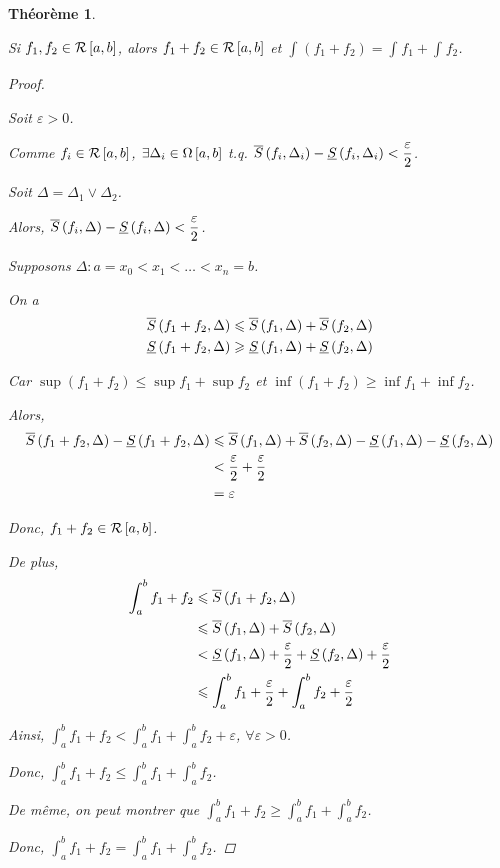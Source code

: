 \documentclass{report}
\newcommand*{\dint}[3]{\displaystyle\int_{#1}^{#2}#3}
\newcommand*{\raffinement}[2]{#1 \vee #2}
\newcommand*{\eps}{\varepsilon}
\newcommand*{\lte}{\leqslant}
\newcommand*{\gte}{\geqslant}
\newtheorem*{thm}{Th\'eor\`eme}
\theoremstyle{definition}
\theoremstyle{remark}
\begin{document}
	\begin{thm}
		~

		Si $f_1,f_2 \in \riemann$, alors $f_1+f_2 \in \riemann$ et $\dint{}{}{\left( f_1+f_2 \right)} =\dint{}{}{f_1} + \dint{}{}{f_2}$.
		\begin{proof}~

			Soit $\eps>0$.

			Comme $f_i \in \riemann$, $\exists\Delta_i \in \partitions$ t.q. $\ssup{f_i}[\Delta_i]-\sinf{f_i}[\Delta_i]<\dfrac{\eps}{2}$.

			Soit $\Delta = \raffinement{\Delta_1}{\Delta_2}$.

			Alors, $\ssup{f_i}-\sinf{f_i}<\dfrac{\eps}{2}$.

			Supposons $\Delta:a=x_0<x_1<\dotsc<x_n=b$.

			On a
			\begin{align*}
				\ssup{f_1+f_2}&\lte \ssup{f_1} + \ssup{f_2}\\
				\sinf{f_1+f_2}&\gte \sinf{f_1} + \sinf{f_2}
			\end{align*}

			Car $\sup(f_1+f_2) \lte \sup f_1 + \sup f_2$ et $\inf(f_1+f_2) \gte \inf f_1 + \inf f_2$.

			Alors,
			\begin{align*}
				\ssup{f_1+f_2}-\sinf{f_1+f_2}&\lte \ssup{f_1} + \ssup{f_2} - \sinf{f_1} - \sinf{f_2}\\
				&< \dfrac{\eps}{2} + \dfrac{\eps}{2}\\
				&= \eps
			\end{align*}

			Donc, $f_1+f_2 \in \riemann$.

			De plus,
			\begin{align*}
				\dint{a}{b}{f_1+f_2}&\lte \ssup{f_1+f_2}\\
				&\lte \ssup{f_1} + \ssup{f_2}\\
				&< \sinf{f_1}+\dfrac{\eps}{2} + \sinf{f_2}+\dfrac{\eps}{2}\\
				&\lte \dint{a}{b}{f_1}+\dfrac{\eps}{2} + \dint{a}{b}{f_2}+\dfrac{\eps}{2}
			\end{align*}

			Ainsi, $\dint{a}{b}{f_1+f_2} < \dint{a}{b}{f_1} + \dint{a}{b}{f_2} + \eps$, $\forall\eps>0$.

			Donc, $\dint{a}{b}{f_1+f_2} \lte \dint{a}{b}{f_1} + \dint{a}{b}{f_2}$.

			De m\^eme, on peut montrer que $\dint{a}{b}{f_1+f_2} \gte \dint{a}{b}{f_1} + \dint{a}{b}{f_2}$.

			Donc, $\dint{a}{b}{f_1+f_2} = \dint{a}{b}{f_1} + \dint{a}{b}{f_2}$.
		\end{proof}
	\end{thm}
\end{document}
